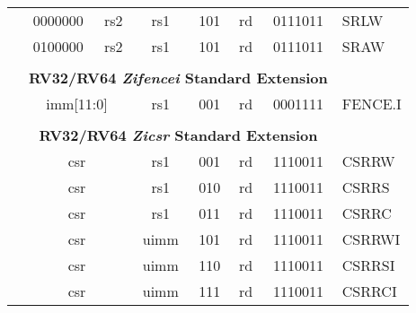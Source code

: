 \begin{table}[p]
\begin{small}
\begin{center}
\begin{tabular}{p{0in}p{0.4in}p{0.05in}p{0.05in}p{0.05in}p{0.05in}p{0.4in}p{0.6in}p{0.4in}p{0.6in}p{0.7in}l}
&
\multicolumn{4}{|c|}{0000000} &
\multicolumn{2}{c|}{rs2} &
\multicolumn{1}{c|}{rs1} &
\multicolumn{1}{c|}{101} &
\multicolumn{1}{c|}{rd} &
\multicolumn{1}{c|}{0111011} & SRLW \\
\cline{2-11}
  

&
\multicolumn{4}{|c|}{0100000} &
\multicolumn{2}{c|}{rs2} &
\multicolumn{1}{c|}{rs1} &
\multicolumn{1}{c|}{101} &
\multicolumn{1}{c|}{rd} &
\multicolumn{1}{c|}{0111011} & SRAW \\
\cline{2-11}
  

&
\multicolumn{10}{c}{} & \\
&
\multicolumn{10}{c}{\bf RV32/RV64 \emph{Zifencei} Standard Extension} & \\
\cline{2-11}
  

&
\multicolumn{6}{|c|}{imm[11:0]} &
\multicolumn{1}{c|}{rs1} &
\multicolumn{1}{c|}{001} &
\multicolumn{1}{c|}{rd} &
\multicolumn{1}{c|}{0001111} & FENCE.I \\
\cline{2-11}
  

&
\multicolumn{10}{c}{} & \\
&
\multicolumn{10}{c}{\bf RV32/RV64 \emph{Zicsr} Standard Extension} & \\
\cline{2-11}
  

&
\multicolumn{6}{|c|}{csr} &
\multicolumn{1}{c|}{rs1} &
\multicolumn{1}{c|}{001} &
\multicolumn{1}{c|}{rd} &
\multicolumn{1}{c|}{1110011} & CSRRW \\
\cline{2-11}
  

&
\multicolumn{6}{|c|}{csr} &
\multicolumn{1}{c|}{rs1} &
\multicolumn{1}{c|}{010} &
\multicolumn{1}{c|}{rd} &
\multicolumn{1}{c|}{1110011} & CSRRS \\
\cline{2-11}
  

&
\multicolumn{6}{|c|}{csr} &
\multicolumn{1}{c|}{rs1} &
\multicolumn{1}{c|}{011} &
\multicolumn{1}{c|}{rd} &
\multicolumn{1}{c|}{1110011} & CSRRC \\
\cline{2-11}
  

&
\multicolumn{6}{|c|}{csr} &
\multicolumn{1}{c|}{uimm} &
\multicolumn{1}{c|}{101} &
\multicolumn{1}{c|}{rd} &
\multicolumn{1}{c|}{1110011} & CSRRWI \\
\cline{2-11}
  

&
\multicolumn{6}{|c|}{csr} &
\multicolumn{1}{c|}{uimm} &
\multicolumn{1}{c|}{110} &
\multicolumn{1}{c|}{rd} &
\multicolumn{1}{c|}{1110011} & CSRRSI \\
\cline{2-11}
  

&
\multicolumn{6}{|c|}{csr} &
\multicolumn{1}{c|}{uimm} &
\multicolumn{1}{c|}{111} &
\multicolumn{1}{c|}{rd} &
\multicolumn{1}{c|}{1110011} & CSRRCI \\
\cline{2-11}
  


\end{tabular}
\end{center}
\end{small}
\end{table}
